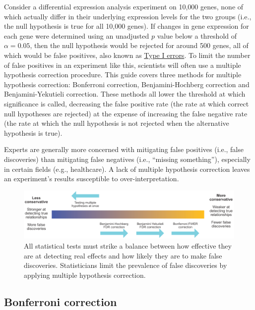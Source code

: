 \documentclass[letterpaper, 12pt]{article}
\begin{document}
Consider a differential expression analysis experiment on 10,000 genes, none of which actually differ in their underlying expression levels for the two groups (i.e., the null hypothesis is true for all 10,000 genes). If changes in gene expression for each gene were determined using an unadjusted $p$ value below a threshold of $\alpha = 0.05$, then the null hypothesis would be rejected for around 500 genes, all of which would be false positives, also known as \href{https://en.wikipedia.org/wiki/Type_I_and_type_II_errors}{Type I errors}. To limit the number of false positives in an experiment like this, scientists will often use a multiple hypothesis correction procedure. This guide covers three methods for multiple hypothesis correction: Bonferroni correction, Benjamini-Hochberg correction and Benjamini-Yekutieli correction. These methods all lower the threshold at which significance is called, decreasing the false positive rate (the rate at which correct null hypotheses are rejected) at the expense of increasing the false negative rate (the rate at which the null hypothesis is not rejected when the alternative hypothesis is true).

Experts are generally more concerned with mitigating false positives (i.e., false discoveries) than mitigating false negatives (i.e., ``missing something''), especially in certain fields (e.g., healthcare). A lack of multiple hypothesis correction leaves an experiment's results susceptible to over-interpretation.

\begin{figure}[h!tbp]
    \centering
    \includegraphics[width=\textwidth]{img/multiple_hypothesis_correction/fdr_diagram.png}
    \caption*{All statistical tests must strike a balance between how effective they are at detecting real effects and how likely they are to make false discoveries. Statisticians limit the prevalence of false discoveries by applying multiple hypothesis correction.}
\end{figure}

\subsection*{Bonferroni correction}
\end{document}
